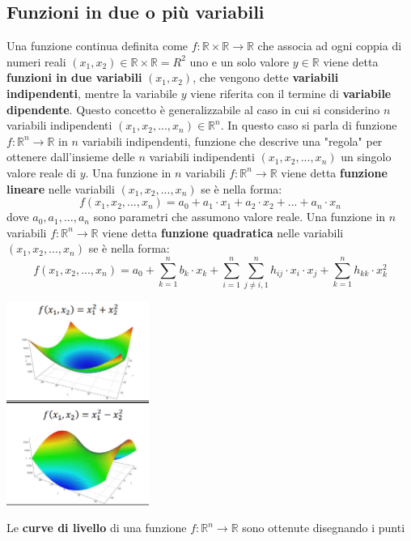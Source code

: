 \documentclass[12pt]{article}
\begin{document}
\subsection{Funzioni in due o più variabili}
Una funzione continua definita come $f: \mathbb{R} \times \mathbb{R} \rightarrow \mathbb{R}$ che associa ad ogni coppia di numeri reali $(x_1, x_2) \in \mathbb{R} \times \mathbb{R} = R^2$ uno
e un solo valore $y \in \mathbb{R}$ viene detta \textbf{funzioni in due variabili} $(x_1, x_2)$, che vengono dette \textbf{variabili indipendenti}, mentre la variabile $y$ viene riferita con il termine di
\textbf{variabile dipendente}.
Questo concetto è generalizzabile al caso in cui si considerino $n$ variabili indipendenti $(x_1, x_2, ..., x_n) \in \mathbb{R}^n$. In questo caso
si parla di funzione $f: \mathbb{R}^n \rightarrow \mathbb{R}$ in $n$ variabili indipendenti, funzione che descrive una "regola" per ottenere dall'insieme delle $n$ variabili indipendenti $(x_1, x_2, ..., x_n)$ un singolo
valore reale di $y$. \newline
Una funzione in $n$ variabili $f: \mathbb{R}^n \rightarrow \mathbb{R}$ viene detta \textbf{funzione lineare} nelle variabili $(x_1, x_2, ..., x_n)$ se è nella forma:
$$f(x_1, x_2, ..., x_n) = a_0 + a_1 \cdot x_1 + a_2 \cdot x_2 + ... + a_n \cdot x_n$$
dove $a_0, a_1, ..., a_n$ sono parametri che assumono valore reale. \newline
Una funzione in $n$ variabili $f: \mathbb{R}^n \rightarrow \mathbb{R}$ viene detta \textbf{funzione quadratica} nelle variabili $(x_1, x_2, ..., x_n)$ se è nella forma:
$$f(x_1, x_2, ..., x_n) = a_0 + \sum_{k=1}^n b_k \cdot x_k + \sum_{i = 1}^n \sum_{j \neq i,1}^n h_{ij} \cdot x_i \cdot x_j + \sum_{k=1}^n h_{kk} \cdot x_k^2$$
\begin{center}
    \includegraphics[width = 0.35\textwidth]{Images/2.PNG}
\end{center}
Le \textbf{curve di livello} di una funzione $f: \mathbb{R}^n \rightarrow \mathbb{R}$ sono ottenute disegnando i punti
\end{document}
